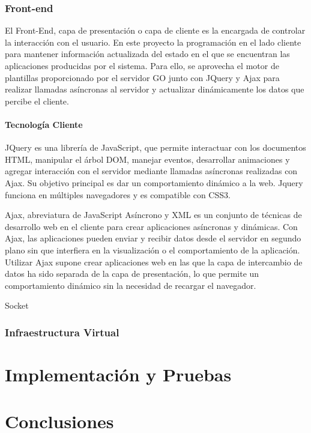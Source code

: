 \documentclass[a4paper,11pt]{book}
\begin{document}
\subsection{Front-end}

El Front-End, capa de presentación o capa de cliente es la encargada de controlar la interacción con el usuario. En este proyecto la programación en el lado cliente para mantener  información actualizada del estado en el que se encuentran las aplicaciones producidas por el sistema. Para ello, se aprovecha el motor de plantillas proporcionado por el servidor GO junto con JQuery y Ajax para realizar llamadas asíncronas al servidor y actualizar dinámicamente los datos que percibe el cliente.

\subsubsection{Tecnología Cliente}


JQuery\cite{jq} es una librería de JavaScript, que permite interactuar con los documentos HTML, manipular el árbol DOM, manejar eventos, desarrollar animaciones y agregar interacción con el servidor mediante llamadas asíncronas realizadas con Ajax. Su objetivo principal es dar un comportamiento dinámico a la web. Jquery funciona en múltiples navegadores y es compatible con CSS3.  

Ajax\cite{aj}, abreviatura de JavaScript Asíncrono y XML es un conjunto de técnicas de desarrollo web en el cliente para crear aplicaciones asíncronas y dinámicas. Con Ajax, las aplicaciones pueden enviar y recibir datos desde el servidor en segundo plano sin que interfiera en la visualización o el comportamiento de la aplicación. Utilizar Ajax supone crear aplicaciones web en las que la capa de intercambio de datos ha sido separada de la capa de presentación, lo que permite un comportamiento dinámico sin la necesidad de recargar el navegador. 


Socket 

\subsection{Infraestructura Virtual}

\chapter{ Implementación y Pruebas}

\chapter{Conclusiones}
\end{document}
